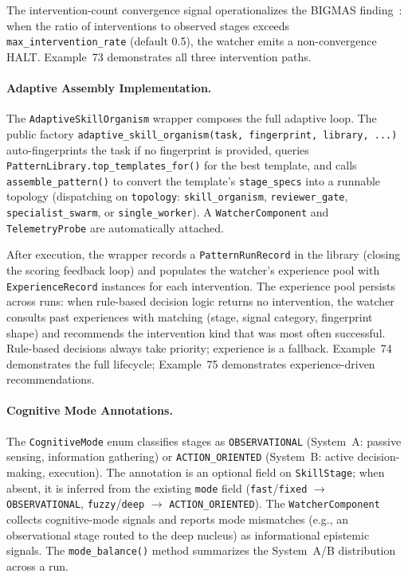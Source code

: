 The intervention-count convergence signal operationalizes the BIGMAS finding~\cite{hao2026bigmas}: when the ratio of interventions to observed stages exceeds \texttt{max\_intervention\_rate} (default 0.5), the watcher emits a non-convergence HALT. Example~73 demonstrates all three intervention paths.

\paragraph{Adaptive Assembly Implementation.}
\label{sec:adaptive-impl}
The \texttt{AdaptiveSkillOrganism} wrapper composes the full adaptive loop. The public factory \texttt{adaptive\_skill\_organism(task, fingerprint, library, ...)} auto-fingerprints the task if no fingerprint is provided, queries \texttt{PatternLibrary.top\_templates\_for()} for the best template, and calls \texttt{assemble\_pattern()} to convert the template's \texttt{stage\_specs} into a runnable topology (dispatching on \texttt{topology}: \texttt{skill\_organism}, \texttt{reviewer\_gate}, \texttt{specialist\_swarm}, or \texttt{single\_worker}). A \texttt{WatcherComponent} and \texttt{TelemetryProbe} are automatically attached.

After execution, the wrapper records a \texttt{PatternRunRecord} in the library (closing the scoring feedback loop) and populates the watcher's experience pool with \texttt{ExperienceRecord} instances for each intervention. The experience pool persists across runs: when rule-based decision logic returns no intervention, the watcher consults past experiences with matching (stage, signal category, fingerprint shape) and recommends the intervention kind that was most often successful. Rule-based decisions always take priority; experience is a fallback. Example~74 demonstrates the full lifecycle; Example~75 demonstrates experience-driven recommendations.

\paragraph{Cognitive Mode Annotations.}
\label{sec:cognitive-modes-impl}
The \texttt{CognitiveMode} enum classifies stages as \texttt{OBSERVATIONAL} (System~A: passive sensing, information gathering) or \texttt{ACTION\_ORIENTED} (System~B: active decision-making, execution). The annotation is an optional field on \texttt{SkillStage}; when absent, it is inferred from the existing \texttt{mode} field (\texttt{fast}/\texttt{fixed} $\to$ \texttt{OBSERVATIONAL}, \texttt{fuzzy}/\texttt{deep} $\to$ \texttt{ACTION\_ORIENTED}). The \texttt{WatcherComponent} collects cognitive-mode signals and reports mode mismatches (e.g., an observational stage routed to the deep nucleus) as informational epistemic signals. The \texttt{mode\_balance()} method summarizes the System~A/B distribution across a run.

